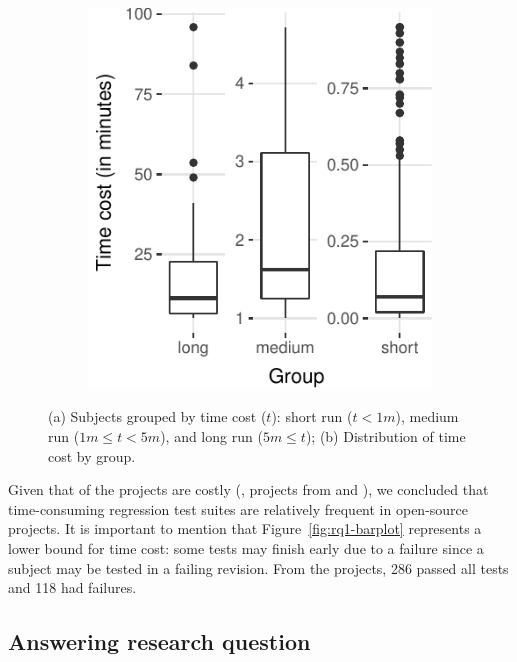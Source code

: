 \begin{figure}[ht]
\begin{subfigure}{0.25\textwidth}
        \includegraphics[width=\textwidth]{plots/boxplot-timecost.pdf}
        \caption{\label{fig:rq1-boxplot}}
    \end{subfigure}%
    \caption{(a) Subjects grouped by time cost ($t$): short run ($t <
    1m$), medium run ($1m \le t < 5m$), and long run ($5m \le t$); (b)
    Distribution of time cost by group.}
\end{figure}

Given that \percentMedLongRunning{} of the projects are costly (\ie,
\numMedLong{} projects from \medg{} and \longg{}), we concluded that
time-consuming regression test suites are relatively frequent in
open-source projects.  It is important to mention that
Figure~\ref{fig:rq1-barplot} represents a lower bound for time cost:
some tests may finish early due to a failure since a subject may be
tested in a failing revision. From the \numSubjs{} projects, 286
passed all tests and 118 had failures. 

\subsection{Answering research question \numRQB{}}
\label{sec:rqB}

